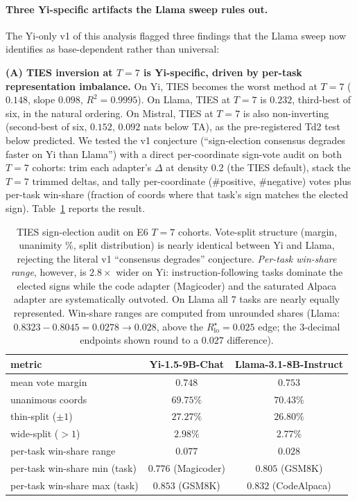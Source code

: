 \paragraph{Three Yi-specific artifacts the Llama sweep rules out.}
The Yi-only v1 of this analysis flagged three findings that the
Llama sweep now identifies as base-dependent rather than universal:

\textbf{(A) TIES inversion at $T = 7$ is Yi-specific, driven by
per-task representation imbalance.} On Yi, TIES becomes the worst
method at $T = 7$ ($0.148$, slope $0.098$, $R^2 = 0.9995$). On
Llama, TIES at $T = 7$ is $0.232$, third-best of six, in the
natural ordering. On Mistral, TIES at $T = 7$ is also non-inverting
(second-best of six, $0.152$, $0.092$ nats below TA), as the
pre-registered Td2 test below predicted. We tested the v1 conjecture (``sign-election
consensus degrades faster on Yi than Llama'') with a direct
per-coordinate sign-vote audit on both $T = 7$ cohorts: trim each
adapter's $\Delta$ at density $0.2$ (the TIES default), stack the
$T = 7$ trimmed deltas, and tally per-coordinate (\#positive,
\#negative) votes plus per-task win-share (fraction of coords where
that task's sign matches the elected sign).
Table~\ref{tab:ties-probe} reports the result.

\begin{table}[t]
\centering
\caption{TIES sign-election audit on E6 $T = 7$ cohorts. Vote-split
structure (margin, unanimity \%, split distribution) is nearly
identical between Yi and Llama, rejecting the literal v1
``consensus degrades'' conjecture. \emph{Per-task win-share range},
however, is $2.8 \times$ wider on Yi: instruction-following tasks
dominate the elected signs while the code adapter (Magicoder) and
the saturated Alpaca adapter are systematically outvoted. On Llama
all $7$ tasks are nearly equally represented. Win-share ranges are
computed from unrounded shares (Llama: $0.8323 - 0.8045 = 0.0278 \to
0.028$, above the $R^\star_{\mathrm{lo}} = 0.025$ edge; the $3$-decimal
endpoints shown round to a $0.027$ difference).}
\label{tab:ties-probe}
\begin{tabular}{lcc}
\hline
metric & Yi-1.5-9B-Chat & Llama-3.1-8B-Instruct \\
\hline
mean vote margin & $0.748$ & $0.753$ \\
unanimous coords & $69.75\%$ & $70.43\%$ \\
thin-split ($\pm 1$) & $27.27\%$ & $26.80\%$ \\
wide-split ($> 1$) & $2.98\%$ & $2.77\%$ \\
per-task win-share range & $\mathbf{0.077}$ & $\mathbf{0.028}$ \\
per-task win-share min (task) & $0.776$ (Magicoder) & $0.805$ (GSM8K) \\
per-task win-share max (task) & $0.853$ (GSM8K) & $0.832$ (CodeAlpaca) \\
\hline
\end{tabular}
\end{table}

